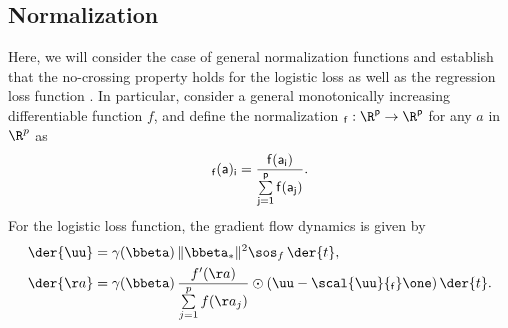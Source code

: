 \documentclass{article}
\theoremstyle{plain}
\theoremstyle{definition}
\theoremstyle{remark}
\begin{document}
\subsection{Normalization} 
Here, we will consider the case of general normalization functions and establish that the no-crossing property holds for the logistic loss as well as the regression loss function . In particular, 
consider a general monotonically increasing differentiable function $f$, and define the normalization $\sf_{f}: \R^{p} \to \R^{p}$ for any $a$ in $\R^{p}$ as
\begin{align*}
  \sf_{f}(a)_i = \frac{f(a_i)}{\sum\limits_{j=1}^{p} f(a_j)}.
\end{align*}
For the logistic loss function, the gradient flow dynamics is given by
\begin{align} \label{eq:general-normalization-logistic} 
  \der{\uu} &=  \gamma(\bbeta) \, \|\bbeta_*\|^2   \sos_{f} \, \der{t}, \\
  \der{\aa} &=  \gamma(\bbeta) \, \frac{f'(\aa)}{\sum\limits_{j=1}^{p} f(\aa_j)} \odot ( \uu - \scal{\uu}{\sf_f} \one ) \, \der{t}.
\end{align}
\end{document}
